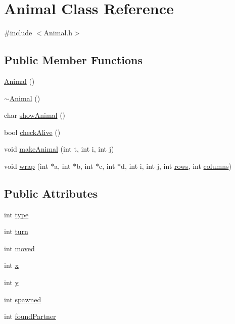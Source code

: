 \hypertarget{class_animal}{}\section{Animal Class Reference}
\label{class_animal}


{\ttfamily \#include $<$Animal.\+h$>$}

\subsection*{Public Member Functions}
\begin{DoxyCompactItemize}
\item 
\hyperlink{class_animal_a1e726a49ec952443190ac62dad22353c}{Animal} ()
\item 
\hyperlink{class_animal_a476af25adde5f0dfa688129c8f86fa5c}{$\sim$\+Animal} ()
\item 
char \hyperlink{class_animal_a58c1c2d1c46c3bdafe1c98251f2d7625}{show\+Animal} ()
\item 
bool \hyperlink{class_animal_a94589f229892de7d480e06a84c3cade1}{check\+Alive} ()
\item 
void \hyperlink{class_animal_aaa1272e3a7d1c4a8da510c6c8803511a}{make\+Animal} (int t, int i, int j)
\item 
void \hyperlink{class_animal_a320357f7cebcfc97e425a20ea326cab7}{wrap} (int $\ast$a, int $\ast$b, int $\ast$c, int $\ast$d, int i, int j, int \hyperlink{wa-tor_8cpp_a586c34fe492dfaa733327c99e8cef1a7}{rows}, int \hyperlink{wa-tor_8cpp_a257ffd4af4f5b4a1792800a1da461fff}{columns})
\end{DoxyCompactItemize}
\subsection*{Public Attributes}
\begin{DoxyCompactItemize}
\item 
int \hyperlink{class_animal_afb08c896c7ab2091765a26933e3bf034}{type}
\item 
int \hyperlink{class_animal_a5e8202860fed2128f74d42126f33daa7}{turn}
\item 
int \hyperlink{class_animal_a3b66e4c2ad4facf254fa60319a2ef07e}{moved}
\item 
int \hyperlink{class_animal_a7bf0bfeda35cb1d9737709e9acfb5bfb}{x}
\item 
int \hyperlink{class_animal_aecc19a45f1ab7e99a4507938f23a02da}{y}
\item 
int \hyperlink{class_animal_a682c71f13c37c2d158ddeb8bbae609e0}{spawned}
\item 
int \hyperlink{class_animal_a1097673af3abe2329151f12972679947}{found\+Partner}
\end{DoxyCompactItemize}


